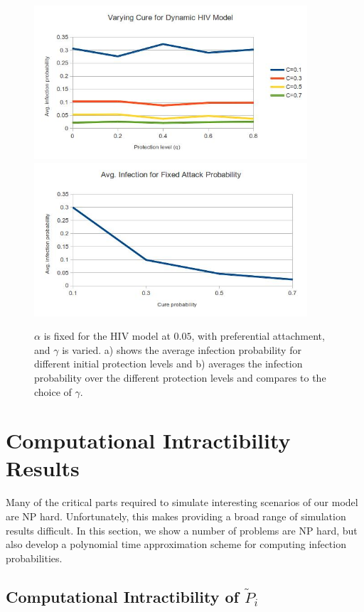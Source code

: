 \documentclass{article}
\theoremstyle{plain}
\begin{document}
\begin{figure}[h!]
  \centering
  \includegraphics[width=4in]{varying_cure_for_dynamic_hiv_model.jpg}
  \includegraphics[width=4in]{avg_infection_for_fixed_attack_probability.jpg}
  \caption{$\alpha$ is fixed for the HIV model at $0.05$, with preferential attachment, and $\gamma$ is varied. a) shows the average infection probability for different initial protection levels and b) averages the infection probability over the different protection levels and compares to the choice of $\gamma$.}
  \label{fig:hiv}
\end{figure}


\section{Computational Intractibility Results}

Many of the critical parts required to simulate interesting scenarios of our model are NP hard. Unfortunately, this makes providing a broad range of simulation results difficult. In this section, we show a number of problems are NP hard, but also develop a polynomial time approximation scheme for computing infection probabilities.

\subsection{Computational Intractibility of $\tilde{P}_i$}
\end{document}
